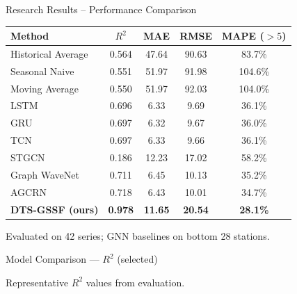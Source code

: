 \documentclass[aspectratio=169, 11pt]{beamer}
\begin{document}
\begin{frame}{Research Results -- Performance Comparison}
  \centering
  \small
  \begin{tabular}{lcccc}
    \toprule
    Method & $R^{2}$ & MAE & RMSE & MAPE ($>5$) \\
    \midrule
    Historical Average & 0.564 & 47.64 & 90.63 & 83.7\% \\
    Seasonal Naive    & 0.551 & 51.97 & 91.98 & 104.6\% \\
    Moving Average    & 0.550 & 51.97 & 92.03 & 104.0\% \\
    \midrule
    LSTM     & 0.696 & 6.33 & 9.69 & 36.1\% \\
    GRU      & 0.697 & 6.32 & 9.67 & 36.0\% \\
    TCN      & 0.697 & 6.33 & 9.66 & 36.1\% \\
    \midrule
    STGCN         & 0.186 & 12.23 & 17.02 & 58.2\% \\
    Graph WaveNet & 0.711 & 6.45  & 10.13 & 35.2\% \\
    AGCRN         & 0.718 & 6.43  & 10.01 & 34.7\% \\
    \midrule
    \textbf{DTS-GSSF (ours)} & \textbf{\color{accent}0.978} & \textbf{\color{accent}11.65} & \textbf{\color{accent}20.54} & \textbf{\color{accent}28.1\%} \\
    \bottomrule
  \end{tabular}

  \vspace{0.2em}
  {\small Evaluated on 42 series; GNN baselines on bottom 28 stations.}
\end{frame}

\begin{frame}{Model Comparison — $R^{2}$ (selected)}
  \centering
  \vspace{0.3em}
  {\small Representative $R^{2}$ values from evaluation.}
\end{frame}
\end{document}
